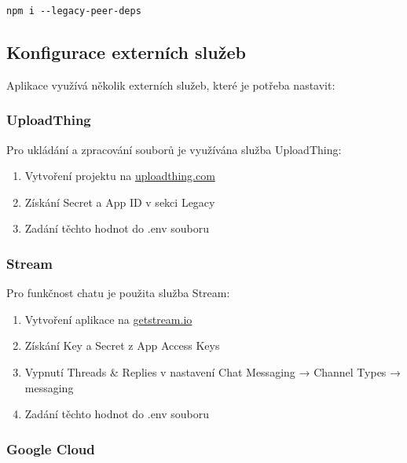 \documentclass[12pt]{article}
\begin{document}
\begin{verbatim}
npm i --legacy-peer-deps
\end{verbatim}

\subsection{Konfigurace externích služeb}

Aplikace využívá několik externích služeb, které je potřeba nastavit:

\subsubsection{UploadThing}

Pro ukládání a zpracování souborů je využívána služba UploadThing:
\begin{enumerate}
  \item Vytvoření projektu na \href{https://uploadthing.com}{uploadthing.com}
  \item Získání Secret a App ID v sekci Legacy
  \item Zadání těchto hodnot do .env souboru
\end{enumerate}

\subsubsection{Stream}

Pro funkčnost chatu je použita služba Stream:
\begin{enumerate}
  \item Vytvoření aplikace na \href{https://getstream.io}{getstream.io}
  \item Získání Key a Secret z App Access Keys
  \item Vypnutí Threads \& Replies v nastavení Chat Messaging → Channel Types → messaging
  \item Zadání těchto hodnot do .env souboru
\end{enumerate}

\subsubsection{Google Cloud}
\end{document}

